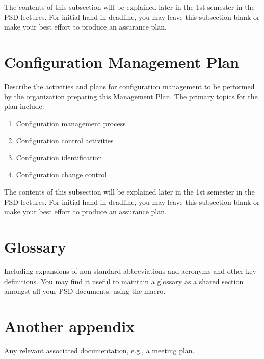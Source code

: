 \documentclass{l3deliverable}
\begin{document}
The contents of this subsection will be explained later in the 1st
semester in the PSD lectures. For initial hand-in deadline, you may
leave this subsection blank or make your best effort to produce an
assurance plan.


\section{Configuration Management Plan}

Describe the activities and plans for configuration management to be
performed by the organization preparing this Management Plan. The
primary topics for the plan include:

\begin{enumerate}
\item Configuration management process
\item Configuration control activities
\item Configuration identification
\item Configuration change control
\end{enumerate}

The contents of this subsection will be explained later in the 1st
semester in the PSD lectures. For initial hand-in deadline, you may
leave this subsection blank or make your best effort to produce an
assurance plan.


\appendix

\section{Glossary}

Including expansions of non-standard abbreviations and acronyms and
other key definitions.  You may find it useful to maintain a glossary
as a shared section amongst all your PSD documents. using the
\verb!! macro.

\section{Another appendix}

Any relevant associated documentation, e.g., a meeting plan.
\end{document}
